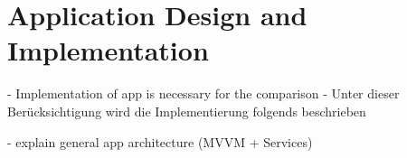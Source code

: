 \chapter{Application Design and Implementation}
- Implementation of app is necessary for the comparison
- Unter dieser Berücksichtigung wird die Implementierung folgends beschrieben

- explain general app architecture (MVVM + Services)

